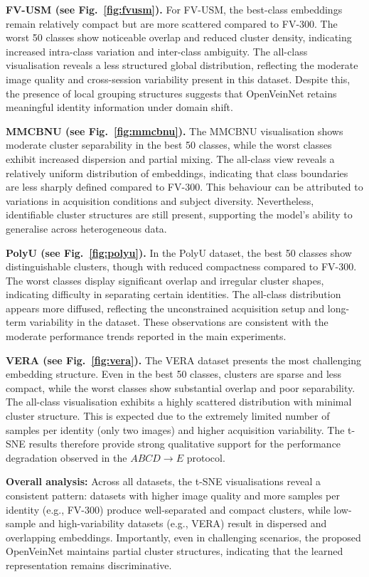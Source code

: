 \documentclass[10pt,journal,compsoc]{IEEEtran}
\begin{document}
\textbf{FV-USM (see Fig.~\ref{fig:fvusm}).}
For FV-USM, the best-class embeddings remain relatively compact but are more scattered compared to FV-300. The worst 50 classes show noticeable overlap and reduced cluster density, indicating increased intra-class variation and inter-class ambiguity. The all-class visualisation reveals a less structured global distribution, reflecting the moderate image quality and cross-session variability present in this dataset. Despite this, the presence of local grouping structures suggests that OpenVeinNet retains meaningful identity information under domain shift.

\textbf{MMCBNU (see Fig.~\ref{fig:mmcbnu}).}
The MMCBNU visualisation shows moderate cluster separability in the best 50 classes, while the worst classes exhibit increased dispersion and partial mixing. The all-class view reveals a relatively uniform distribution of embeddings, indicating that class boundaries are less sharply defined compared to FV-300. This behaviour can be attributed to variations in acquisition conditions and subject diversity. Nevertheless, identifiable cluster structures are still present, supporting the model’s ability to generalise across heterogeneous data.

\textbf{PolyU (see Fig.~\ref{fig:polyu}).}
In the PolyU dataset, the best 50 classes show distinguishable clusters, though with reduced compactness compared to FV-300. The worst classes display significant overlap and irregular cluster shapes, indicating difficulty in separating certain identities. The all-class distribution appears more diffused, reflecting the unconstrained acquisition setup and long-term variability in the dataset. These observations are consistent with the moderate performance trends reported in the main experiments.

\textbf{VERA (see Fig.~\ref{fig:vera}).}
The VERA dataset presents the most challenging embedding structure. Even in the best 50 classes, clusters are sparse and less compact, while the worst classes show substantial overlap and poor separability. The all-class visualisation exhibits a highly scattered distribution with minimal cluster structure. This is expected due to the extremely limited number of samples per identity (only two images) and higher acquisition variability. The t-SNE results therefore provide strong qualitative support for the performance degradation observed in the $ABCD \rightarrow E$ protocol.

\textbf{Overall analysis:}
Across all datasets, the t-SNE visualisations reveal a consistent pattern: datasets with higher image quality and more samples per identity (e.g., FV-300) produce well-separated and compact clusters, while low-sample and high-variability datasets (e.g., VERA) result in dispersed and overlapping embeddings. Importantly, even in challenging scenarios, the proposed OpenVeinNet maintains partial cluster structures, indicating that the learned representation remains discriminative.
\end{document}
